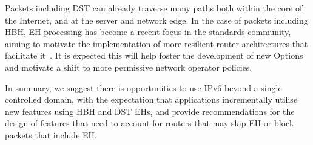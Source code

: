 \documentclass[conference]{IEEEtran}
\begin{document}
Packets including DST can already traverse many paths both within the core of the Internet, and at the server and network edge. In the case of packets including HBH, 
EH processing has become a recent focus in the standards community, aiming to motivate the implementation of more resilient router architectures that facilitate it~\cite{ietf-6man-HBH-processing-06, ietf-v6ops-hbh-03, ietf-6man-eh-limits-02}. 
It is expected this will help foster the development of new Options and motivate a shift to more permissive network operator policies.

In summary, we suggest there is opportunities to use IPv6 beyond a single controlled domain, with the
expectation that applications incrementally utilise new features using HBH and DST EHs, and provide recommendations for the design of  features that need to account for routers that may skip EH or block packets that include EH.


\small

\end{document}
